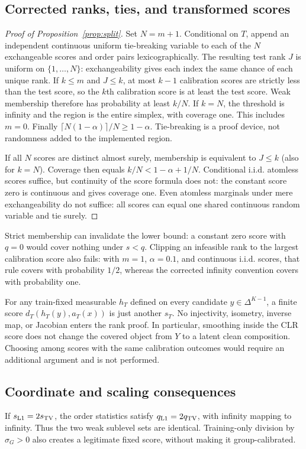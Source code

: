 \documentclass{article}
\theoremstyle{plain}
\newcommand{\simp}{\Delta^{K-1}}
\begin{document}
\subsection{Corrected ranks, ties, and transformed scores}
\begin{proof}[Proof of Proposition~\ref{prop:split}]
Set $N=m+1$. Conditional on $T$, append an independent continuous uniform tie-breaking variable to each of the $N$ exchangeable scores and order pairs lexicographically. The resulting test rank $J$ is uniform on $\{1,\ldots,N\}$: exchangeability gives each index the same chance of each unique rank. If $k\leq m$ and $J\leq k$, at most $k-1$ calibration scores are strictly less than the test score, so the $k$th calibration score is at least the test score. Weak membership therefore has probability at least $k/N$. If $k=N$, the threshold is infinity and the region is the entire simplex, with coverage one. This includes $m=0$. Finally $\lceil N(1-\alpha)\rceil/N\geq1-\alpha$. Tie-breaking is a proof device, not randomness added to the implemented region.

If all $N$ scores are distinct almost surely, membership is equivalent to $J\leq k$ (also for $k=N$). Coverage then equals $k/N<1-\alpha+1/N$. Conditional i.i.d. atomless scores suffice, but continuity of the score formula does not: the constant score zero is continuous and gives coverage one. Even atomless marginals under mere exchangeability do not suffice: all scores can equal one shared continuous random variable and tie surely.
\end{proof}

Strict membership can invalidate the lower bound: a constant zero score with $q=0$ would cover nothing under $s<q$. Clipping an infeasible rank to the largest calibration score also fails: with $m=1$, $\alpha=0.1$, and continuous i.i.d. scores, that rule covers with probability $1/2$, whereas the corrected infinity convention covers with probability one.

For any train-fixed measurable $h_T$ defined on every candidate $y\in\simp$, a finite score $d_T(h_T(y),a_T(x))$ is just another $s_T$. No injectivity, isometry, inverse map, or Jacobian enters the rank proof. In particular, smoothing inside the CLR score does not change the covered object from $Y$ to a latent clean composition. Choosing among scores with the same calibration outcomes would require an additional argument and is not performed.

\subsection{Coordinate and scaling consequences}
If $s_{\rm L1}=2s_{\rm TV}$, the order statistics satisfy $q_{\rm L1}=2q_{\rm TV}$, with infinity mapping to infinity. Thus the two weak sublevel sets are identical. Training-only division by $\sigma_G>0$ also creates a legitimate fixed score, without making it group-calibrated.
\end{document}
